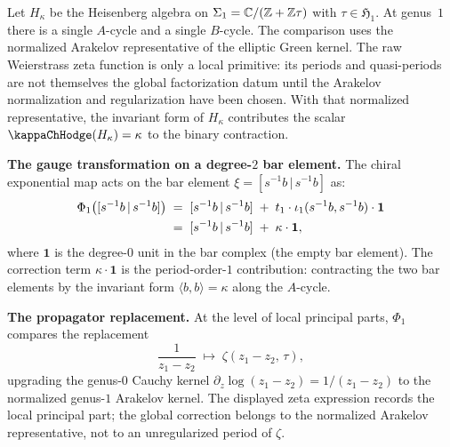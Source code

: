 \begin{example}
\label{ex:chiral-exp-heisenberg}
Let $H_\kappa$ be the Heisenberg algebra on
$\Sigma_1 = \mathbb{C}/(\mathbb{Z} + \mathbb{Z}\tau)$ with $\tau \in \mathfrak{H}_1$.
At genus~$1$ there is a single $A$-cycle and a single $B$-cycle.
The comparison uses the normalized Arakelov representative of the
elliptic Green kernel. The raw Weierstrass zeta function is only a
local primitive: its periods and quasi-periods are not themselves the
global factorization datum until the Arakelov normalization and
regularization have been chosen. With that normalized representative,
the invariant form of $H_\kappa$ contributes the scalar
$\kappaChHodge(H_\kappa)=\kappa$ to the binary contraction.

\smallskip\noindent
\textbf{The gauge transformation on a degree-$2$ bar element.}
The chiral exponential map acts on the bar element
$\xi = [s^{-1}b \,|\, s^{-1}b]$ as:
\begin{align}\label{eq:phi1-heisenberg}
\Phi_1\bigl([s^{-1}b \,|\, s^{-1}b]\bigr)
&\;=\;
[s^{-1}b \,|\, s^{-1}b]
\;+\;
t_1 \cdot \iota_1(s^{-1}b, s^{-1}b) \cdot \mathbf{1}
\notag\\
&\;=\;
[s^{-1}b \,|\, s^{-1}b]
\;+\; \kappa \cdot \mathbf{1},
\end{align}
where $\mathbf{1}$ is the degree-$0$ unit in the bar complex
(the empty bar element). The correction term $\kappa \cdot
\mathbf{1}$ is the period-order-$1$ contribution: contracting
the two bar elements by the invariant form $\langle b, b
\rangle = \kappa$ along the $A$-cycle.

\smallskip\noindent
\textbf{The propagator replacement.}
At the level of local principal parts, $\Phi_1$ compares the
replacement
\[
\frac{1}{z_1 - z_2}
\;\longmapsto\;
\zeta(z_1 - z_2,\, \tau),
\]
upgrading the genus-$0$ Cauchy kernel $\partial_z \log(z_1 -
z_2) = 1/(z_1 - z_2)$ to the normalized genus-$1$ Arakelov
kernel. The displayed zeta expression records the local principal
part; the global correction belongs to the normalized Arakelov
representative, not to an unregularized period of $\zeta$.


\end{example}

